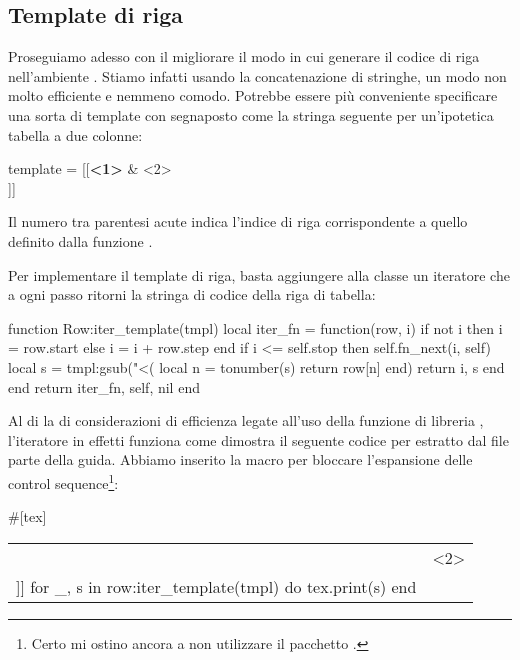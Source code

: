 \subsection{Template di riga}

Proseguiamo adesso con il migliorare il modo in cui generare il codice di riga
nell'ambiente . Stiamo infatti usando la concatenazione di
stringhe, un modo non molto efficiente e nemmeno comodo. Potrebbe essere più
conveniente specificare una sorta di template con segnaposto come la stringa
seguente per un'ipotetica tabella a due colonne:
\begin{lines}
template = [[\textbf{<1>} & <2>\\]]
\end{lines}

Il numero tra parentesi acute \code{<>} indica l'indice di riga corrispondente a
quello definito dalla funzione .

Per implementare il template di riga, basta aggiungere alla classe  un
iteratore che a ogni passo ritorni la stringa di codice della riga di tabella:

%
%
%
%
\begin{lines}
function Row:iter_template(tmpl)
    local iter_fn = function(row, i)
        if not i then
            i = row.start
        else
            i = i + row.step
        end
        if i <= self.stop then
            self.fn_next(i, self)
            local s = tmpl:gsub("<(%
                local n = tonumber(s)
                return row[n]
            end)
            return i, s
        end
    end
    return iter_fn, self, nil
end
\end{lines}

Al di la di considerazioni di efficienza legate all'uso della funzione di
libreria , l'iteratore in effetti funziona come dimostra il seguente
codice per \LuaLaTeX{} estratto dal file  parte
della guida. Abbiamo inserito la macro  per bloccare l'espansione
delle control sequence\footnote{Certo mi ostino ancora a non utilizzare il
pacchetto .}:
\begin{lines}
#[tex]
\begin{tabular}{lr}
\directlua{
local tmpl = [[\noexpand\textbf{<1>} & <2>\noexpand\\]]
for _, s in row:iter_template(tmpl) do
   tex.print(s)
end
}
\end{tabular}
\end{lines}

